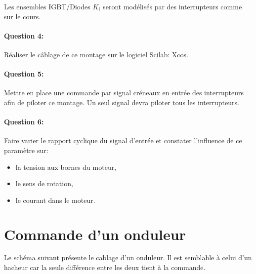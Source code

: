 Les ensembles IGBT/Diodes $K_i$ seront modélisés par des interrupteurs comme sur le cours.

\paragraph{Question 4:} Réaliser le câblage de ce montage sur le logiciel Scilab: Xcos.

\paragraph{Question 5:} Mettre en place une commande par signal créneaux en entrée des interrupteurs afin de piloter ce montage. Un seul signal devra piloter tous les interrupteurs.

\paragraph{Question 6:} Faire varier le rapport cyclique du signal d'entrée et constater l'influence de ce paramètre sur:
\begin{itemize}
 \item la tension aux bornes du moteur,
 \item le sens de rotation,
 \item le courant dans le moteur.
\end{itemize}


\section{Commande d'un onduleur}

Le schéma suivant présente le cablage d'un onduleur. Il est semblable à celui d'un hacheur car la seule différence entre les deux tient à la commande.

